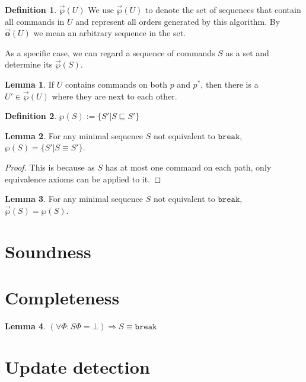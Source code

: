 \documentclass[12pt]{article}
\newcommand{\empt}{\bot}
\newcommand{\FS}{\Phi} %
\newcommand{\pp}{p^*} %
\newcommand{\cbrk}{\mathtt{break}}
\newcommand{\eqext}{\sqsubseteq}
\newcommand{\extset}[1]{\wp({#1})}
\newcommand{\orderset}[1]{\vec{\wp}({#1})}
\newcommand{\ordered}[1]{\vec{\mathbf{o}}({#1})}
\theoremstyle{definition}
\newtheorem{mydef}{Definition}
\newtheorem{mylem}{Lemma}
\begin{document}
\begin{mydef}{$\orderset{U}$}
We use $\orderset{U}$ to denote the set of sequences that contain all commands in $U$
and represent all orders generated by this algorithm.
By $\ordered{U}$ we mean an arbitrary sequence in the set.
\end{mydef}

As a specific case, we can regard a sequence of commands $S$
as a set and determine its $\orderset{S}$.

\begin{mylem}\label{lemma:neighbour}
If $U$ contains commands on both $p$ and $\pp$, then
there is a $U'\in\orderset{U}$ where they are next to each other.
\end{mylem}

\begin{mydef}
$\extset{S} := \{S'|S\eqext S'\}$
\end{mydef}

\begin{mylem}\label{lemma:minextset}
For any minimal sequence $S$ not equivalent to $\cbrk$, $\extset{S} = \{S'|S\equiv S'\}$.
\end{mylem}
\begin{proof}
This is because as $S$ has at most one command on each path, only equivalence axioms
can be applied to it.
\end{proof}

\begin{mylem}\label{lemma:minextorder}
For any minimal sequence $S$ not equivalent to $\cbrk$,
$\orderset{S} = \extset{S}$.
\end{mylem}


\section{Soundness}

\section{Completeness}

\begin{mylem}
\((\forall\FS: S\FS = \empt) \Rightarrow S \equiv \cbrk\)
\end{mylem}

\section{Update detection}
\end{document}
